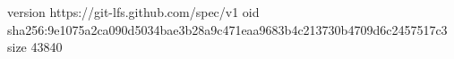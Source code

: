 version https://git-lfs.github.com/spec/v1
oid sha256:9e1075a2ca090d5034bae3b28a9c471eaa9683b4c213730b4709d6c2457517c3
size 43840
